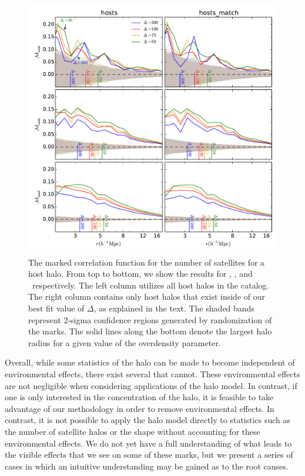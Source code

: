 \documentclass[usenatbib,usegraphicx,letterpaper]{mn2e}
\begin{document}
\begin{figure}
	\centering
	\includegraphics[width=\textwidth]{all_mcf_nsat_z00_hostsvmatch.pdf}
	\caption{The marked correlation function for the number of satellites for a host halo. From top to bottom, we show the results for \simA, \simB, and \simC \ respectively. The left column utilizes all host halos in the catalog. The right column contains only host halos that exist inside of our best fit value of $\Delta$, as explained in the text. The shaded bands represent 2-sigma confidence regions generated by randomization of the marks. The solid lines along the bottom denote the largest halo radius for a given value of the overdensity parameter.}
	\label{fig:hvm_mcf_nsat}
\end{figure}

Overall, while some statistics of the halo can be made to become independent of environmental effects, there exist several that cannot. These environmental effects are not negligible when considering applications of the halo model. In contrast, if one is only interested in the concentration of the halo, it is feasible to take advantage of our methodology in order to remove environmental effects. In contrast, it is not possible to apply the halo model directly to statistics such as the number of satellite halos or the shape without accounting for these environmental effects. We do not yet have a full understanding of what leads to the visible effects that we see on some of these marks, but we present a series of cases in which an intuitive understanding may be gained as to the root causes.
\end{document}
